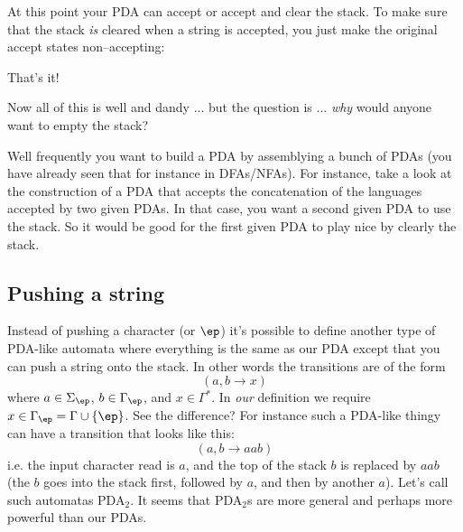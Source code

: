 At this point your PDA can accept or accept and clear the stack. 
To make sure that the stack \textit{ is} cleared when a string is accepted, you
just make the original accept states non--accepting:

\begin{center}
\end{center}


That's it!

Now all of this is well and dandy ... but the question is ... 
\textit{ why} would anyone want to empty the stack?

Well frequently you want to build a PDA by assemblying a bunch of PDAs
(you have already seen that for instance in DFAs/NFAs).
For instance, take a look at the construction of a PDA that accepts
the concatenation of the languages accepted by two given PDAs.
In that case, you want a second given PDA to use the stack.
So it would be good for the first given PDA to play nice by clearly
the stack.

\newpage
\subsection{Pushing a string}

Instead of pushing a character (or $\ep$) it's possible to define another 
type of PDA-like automata where everything is the same as our PDA except that 
you can 
push a string onto the stack.
In other words the transitions are of the form
\[
(a, b \rightarrow x)
\]
where $a \in \Sigma_\ep$, $b \in \Gamma_\ep$, and $x \in \Gamma^*$.
In \textit{ our} definition we require $x \in \Gamma_\ep = \Gamma \cup \{\ep\}$.
See the difference?
For instance such a PDA-like thingy can have a transition that looks like
this:
\[
(a, b \rightarrow aab)
\]
i.e. the input character read is $a$, and the top of the stack $b$ is
replaced by $aab$ (the $b$ goes into the stack first, followed by 
$a$, and then by another $a$).
Let's call such automatas PDA$_2$.
It seems that PDA$_2$s are more general and perhaps more powerful than our 
PDAs.

